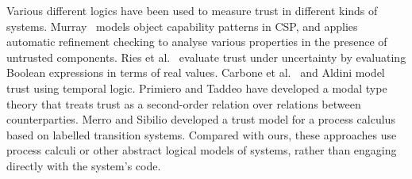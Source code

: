 Various different logics have been used to measure trust in different
kinds of systems.  
Murray~\cite{Murray:phd} models object capability
patterns in CSP, and applies automatic refinement checking to analyse
various properties in the presence of untrusted components.
Ries et al.\ \cite{habib-trust-CertainLogic-2011} evaluate trust under
uncertainty by evaluating Boolean expressions in terms of real values.
Carbone et al.\  \cite{carbone-formal-trust-2011} and 
Aldini \cite{aldini-calculus-trust-IFIPTM2014} model trust using
temporal logic.
Primiero and Taddeo \cite{primiero-modal-theory-trust-2011} have
developed a modal type theory that treats trust as a second-order
relation over relations between
counterparties. Merro and Sibilio
\cite{merro-calculus-trust-adhoc-facs2011} developed a trust model for
a process calculus based on labelled transition systems.
Compared with ours, these approaches use
process calculi or other abstract logical models of systems, rather
than engaging directly with the system's code.


